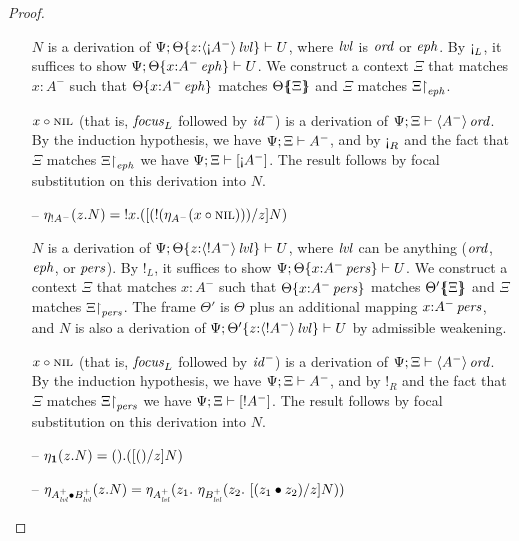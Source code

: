 \begin{proof}
\begin{itemize}
  $N$ is a derivation of 
  $\foc{\Psi}{\tackon{\Theta}{z{:}\islvl{\susp{{\gnab}A^-}}}}{U}$, where
  $\mlvl$ is $\mtrue$ or $\meph$.
  By ${\gnab}_L$, it suffices to show 
  $\foc{\Psi}{\tackon{\Theta}{x{:}\iseph{A^-}}}{U}$.
  We construct a context $\Xi$ that matches $x{:}A^-$ such that
  $\tackon{\Theta}{x{:}\iseph{A^-}}$ matches $\frameoff{\Theta}{\Xi}$
  and $\Xi$ matches $\restrictto{\Xi}{\meph}$.
  \smallskip

  $\tfocusl{x}{\tnil}$ (that is, ${\it focus}_L$ followed by
  ${\it id}^-$) is a derivation of $\foc{\Psi}{\Xi}{\istrue{\susp{A^-}}}$. 
  By the induction hypothesis, we have $\foc{\Psi}{\Xi}{A^-}$, 
  and by ${\gnab}_R$ and the fact that $\Xi$ matches $\restrictto{\Xi}{\meph}$
  we have $\foc{\Psi}{\Xi}{[{\gnab}A^-]}$. The result follows
  by focal substitution on this derivation into $N$.
  \smallskip

\item[--] $\etapa{z}{N}{{!}A^-}
           = \tbangl{x}{([(\tbangr{(\etana{\tfocusl{x}{\tnil}}{A^-})})/z]N)}$ 
  \smallskip

  $N$ is a derivation of 
  $\foc{\Psi}{\tackon{\Theta}{z{:}\islvl{\susp{{!}A^-}}}}{U}$, where
  $\mlvl$ can be anything ($\mtrue$, $\meph$, or $\mpers$).
  By ${!}_L$, it suffices to show 
  $\foc{\Psi}{\tackon{\Theta}{x{:}\ispers{A^-}}}{U}$.
  We construct a context $\Xi$ that matches $x{:}A^-$ such that
  $\tackon{\Theta}{x{:}\ispers{A^-}}$ matches $\frameoff{\Theta'}{\Xi}$
  and $\Xi$ matches $\restrictto{\Xi}{\mpers}$. The frame
  $\Theta'$ is $\Theta$ plus an additional mapping 
  $x{:}\ispers{A^-}$, and $N$ is also a derivation of 
  $\foc{\Psi}{\tackon{\Theta'}{z{:}\islvl{\susp{{!}A^-}}}}{U}$
  by admissible weakening.
  \smallskip

  $\tfocusl{x}{\tnil}$ (that is, ${\it focus}_L$ followed by
  ${\it id}^-$) is a derivation of $\foc{\Psi}{\Xi}{\istrue{\susp{A^-}}}$. 
  By the induction hypothesis, we have $\foc{\Psi}{\Xi}{A^-}$, 
  and by ${!}_R$ and the fact that $\Xi$ matches $\restrictto{\Xi}{\mpers}$
  we have $\foc{\Psi}{\Xi}{[{!}A^-]}$. The result follows
  by focal substitution on this derivation into $N$.
  \smallskip

\item[--] $\etapa{z}{N}{\one} = \tonel{([\toner/z]N)}$ 
\item[--] $\etapa{z}{N}{A^+_\mlvl \fuse B^+_\mlvl} =
            \etapa{z_1}
             {~\etapa{z_2}
              {~[(\tfuser{z_1}{z_2})/z]N}
              {B^+_\mlvl}}
             {A^+_\mlvl}$
  \smallskip


\end{itemize}
\end{proof}
